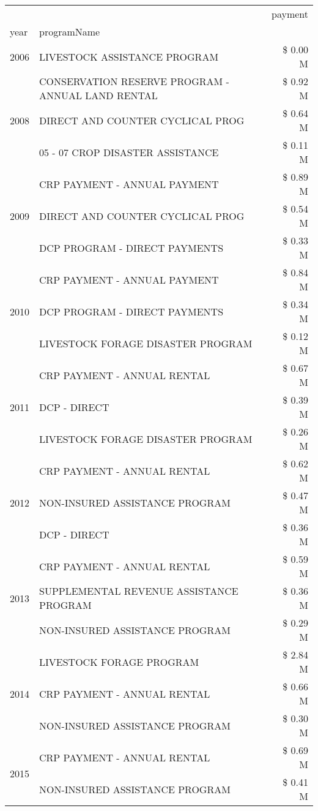 \begin{tabular}{llr}
\toprule
 &  & payment \\
year & programName &  \\
\midrule
2006 & LIVESTOCK ASSISTANCE PROGRAM & \$ 0.00 M \\
\cline{1-3}
\multirow[t]{3}{*}{2008} & CONSERVATION RESERVE PROGRAM - ANNUAL LAND RENTAL & \$ 0.92 M \\
 & DIRECT AND COUNTER CYCLICAL PROG & \$ 0.64 M \\
 & 05 - 07 CROP DISASTER ASSISTANCE & \$ 0.11 M \\
\cline{1-3}
\multirow[t]{3}{*}{2009} & CRP PAYMENT - ANNUAL PAYMENT & \$ 0.89 M \\
 & DIRECT AND COUNTER CYCLICAL PROG & \$ 0.54 M \\
 & DCP PROGRAM - DIRECT PAYMENTS & \$ 0.33 M \\
\cline{1-3}
\multirow[t]{3}{*}{2010} & CRP PAYMENT - ANNUAL PAYMENT & \$ 0.84 M \\
 & DCP PROGRAM - DIRECT PAYMENTS & \$ 0.34 M \\
 & LIVESTOCK FORAGE DISASTER  PROGRAM & \$ 0.12 M \\
\cline{1-3}
\multirow[t]{3}{*}{2011} & CRP PAYMENT - ANNUAL RENTAL & \$ 0.67 M \\
 & DCP - DIRECT & \$ 0.39 M \\
 & LIVESTOCK FORAGE DISASTER PROGRAM & \$ 0.26 M \\
\cline{1-3}
\multirow[t]{3}{*}{2012} & CRP PAYMENT - ANNUAL RENTAL & \$ 0.62 M \\
 & NON-INSURED ASSISTANCE PROGRAM & \$ 0.47 M \\
 & DCP - DIRECT & \$ 0.36 M \\
\cline{1-3}
\multirow[t]{3}{*}{2013} & CRP PAYMENT - ANNUAL RENTAL & \$ 0.59 M \\
 & SUPPLEMENTAL REVENUE ASSISTANCE PROGRAM & \$ 0.36 M \\
 & NON-INSURED ASSISTANCE PROGRAM & \$ 0.29 M \\
\cline{1-3}
\multirow[t]{3}{*}{2014} & LIVESTOCK FORAGE PROGRAM & \$ 2.84 M \\
 & CRP PAYMENT - ANNUAL RENTAL & \$ 0.66 M \\
 & NON-INSURED ASSISTANCE PROGRAM & \$ 0.30 M \\
\cline{1-3}
\multirow[t]{3}{*}{2015} & CRP PAYMENT - ANNUAL RENTAL & \$ 0.69 M \\
 & NON-INSURED ASSISTANCE PROGRAM & \$ 0.41 M \\

\end{tabular}
